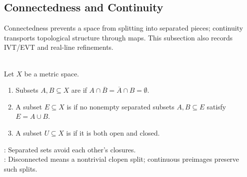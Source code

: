 \subsection{Connectedness and Continuity}\label{subsec:connectedness-and-continuity}

%


Connectedness prevents a space from splitting into separated pieces; continuity transports topological structure through maps. This subsection also records IVT/EVT and real-line refinements.

\begin{definition} \label{def:separated-and-connected-sets} \\
Let $X$ be a metric space.
\begin{enumerate}[label=(\roman*)]
\setlength{\itemsep}{0pt}
\item Subsets $A,B\subseteq X$ are  if $A\cap\overline{B}=\overline{A}\cap B=\emptyset$.
\item A subset $E\subseteq X$ is  if no nonempty separated subsets $A,B\subseteq E$ satisfy $E=A\cup B$.
\item A subset $U\subseteq X$ is  if it is both open and closed.
\end{enumerate}
: Separated sets avoid each other's closures.\\
: Disconnected means a nontrivial clopen split; continuous preimages preserve such splits.
\end{definition}

